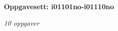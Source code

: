 \centerline{\bf Oppgavesett: i01101no-i01110no}
\vskip 10pt
\centerline{\it 10 oppgaver}\vskip 10pt
\vskip 10pt
